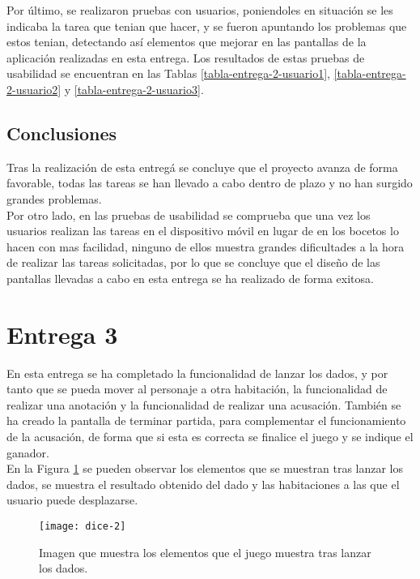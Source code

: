 \begin{itemize}
Por último, se realizaron pruebas con usuarios, poniendoles en situación se les indicaba la tarea que tenian que hacer, y se fueron apuntando los problemas que estos tenian, detectando así elementos que mejorar en las pantallas de la aplicación realizadas en esta entrega. Los resultados de estas pruebas de usabilidad se encuentran en las Tablas \ref{tabla-entrega-2-usuario1}, \ref{tabla-entrega-2-usuario2} y \ref{tabla-entrega-2-usuario3}.

\subsection{Conclusiones}
Tras la realización de esta entregá se concluye que el proyecto avanza de forma favorable, todas las tareas se han llevado a cabo dentro de plazo y no han surgido grandes problemas.\\

Por otro lado, en las pruebas de usabilidad se comprueba que una vez los usuarios realizan las tareas en el dispositivo móvil en lugar de en los bocetos lo hacen con mas facilidad, ninguno de ellos muestra grandes dificultades a la hora de realizar las tareas solicitadas, por lo que se concluye que el diseño de las pantallas llevadas a cabo en esta entrega se ha realizado de forma exitosa.

\section{Entrega 3}
En esta entrega se ha completado la funcionalidad de lanzar los dados, y por tanto que se pueda mover al personaje a otra habitación, la funcionalidad de realizar una anotación y la funcionalidad de realizar una acusación. También se ha creado la pantalla de terminar partida, para complementar el funcionamiento de la acusación, de forma que si esta es correcta se finalice el juego y se indique el ganador.\\

En la Figura \ref{figura-dado-1} se pueden observar los elementos que se muestran tras lanzar los dados, se muestra el resultado obtenido del dado y las habitaciones a las que el usuario puede desplazarse.

\begin{figure}[h]
  \centering
  \texttt{[image: dice-2]}
  \caption{Imagen que muestra los elementos que el juego muestra tras lanzar los dados.}
  \label{figura-dado-1}
\end{figure}


\end{itemize}
